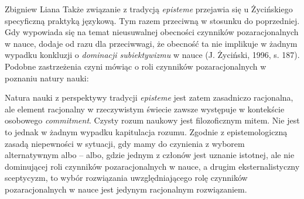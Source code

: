 \begin{artplenv}{Zbigniew Liana}
Także związanie z tradycją \textit{episteme} przejawia się u Życińskiego specyficzną praktyką językową. Tym razem
przeciwną w stosunku do poprzedniej. Gdy wypowiada się na temat nieusuwalnej obecności czynników pozaracjonalnych w nauce,
dodaje od razu  dla przeciwwagi, że obecność ta nie implikuje w żadnym wypadku konkluzji o \textit{dominacji
subiektywizmu} w nauce \label{ref:RND5RKyXkJozz}(J. Życiński, 1996, s. 187). Podobne zastrzeżenia czyni  mówiąc o roli
czynników pozaracjonalnych w poznaniu natury nauki:


Natura nauki z perspektywy tradycji \textit{episteme} jest zatem zasadniczo racjonalna, ale element racjonalny w rzeczywistym
świecie zawsze występuje w kontekście osobowego \textit{commitment}. Czysty rozum naukowy jest filozoficznym
mitem. Nie jest to jednak w żadnym wypadku kapitulacja rozumu. Zgodnie z epistemologiczną zasadą niepewności w sytuacji,
gdy mamy do czynienia z wyborem alternatywnym albo -- albo, gdzie jednym z członów jest uznanie istotnej, ale
nie dominującej roli czynników pozaracjonalnych w nauce, a drugim eksternalistyczny sceptycyzm, to wybór rozwiązania
uwzględniającego rolę czynników pozaracjonalnych w nauce jest jedynym racjonalnym rozwiązaniem.




%
%
%
%
%
%
%
%
%
%
%
%
%
%
%
%
%
%
%



\end{artplenv}